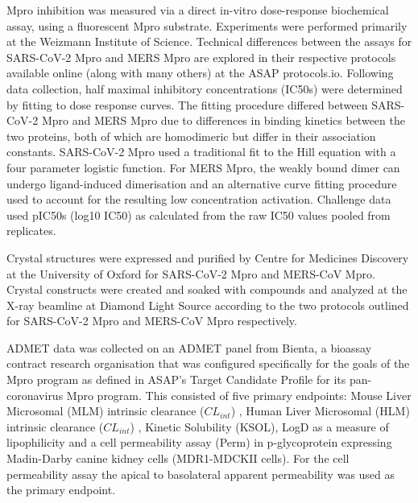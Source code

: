 \documentclass[journal=jcim,manuscript=article]{achemso}
\begin{document}
Mpro inhibition was measured via a direct in-vitro dose-response biochemical assay, using a fluorescent Mpro substrate. Experiments were performed primarily at the Weizmann Institute of Science. Technical differences between the assays for SARS-CoV-2 Mpro\cite{sars_mpro_dose_response_protocol} and MERS Mpro\cite{mers_mpro_dose_response_protocol} are explored in their respective protocols available online (along with many others) at the ASAP protocols.io\cite{asap_protocols_io}. Following data collection, half maximal inhibitory concentrations (IC50s) were determined by fitting to dose response curves. The fitting procedure differed between SARS-CoV-2 Mpro and MERS Mpro due to differences in binding kinetics between the two proteins, both of which are homodimeric but differ in their association constants. SARS-CoV-2 Mpro used a traditional fit to the Hill equation with a four parameter logistic function. For MERS Mpro, the weakly bound dimer can undergo ligand-induced dimerisation and an alternative curve fitting procedure used to account for the resulting low concentration activation. Challenge data used pIC50s (log10 IC50) as calculated from the raw IC50 values pooled from replicates. 

Crystal structures were expressed and purified by Centre for Medicines Discovery at the University of Oxford for SARS-CoV-2 Mpro and  MERS-CoV Mpro. Crystal constructs were created and soaked with compounds and analyzed at the X-ray beamline at Diamond Light Source according to the two protocols outlined for SARS-CoV-2 Mpro\cite{sars_mpro_crystal_protocol} and MERS-CoV Mpro respectively\cite{mers_mpro_crystal_protocol}. 

ADMET data was collected on an ADMET panel from Bienta, a bioassay contract research organisation that was configured specifically for the goals of the Mpro program as defined in ASAP’s Target Candidate Profile\cite{sars_mers_tcp} for its pan-coronavirus Mpro program. This consisted of five primary endpoints: Mouse Liver Microsomal (MLM) intrinsic clearance ($CL_{int}$) , Human Liver Microsomal (HLM) intrinsic clearance ($CL_{int}$) \cite{hlm_mlm_assay_protcol}, Kinetic Solubility (KSOL)\cite{ksol_assay_protocol}, LogD as a measure of lipophilicity\cite{logD_assay_protocol} and a cell permeability assay (Perm) in p-glycoprotein expressing Madin-Darby canine kidney cells (MDR1-MDCKII cells)\cite{perm_assay_protocol}.  For the cell permeability assay the apical to basolateral apparent permeability was used as the primary endpoint.
\end{document}
